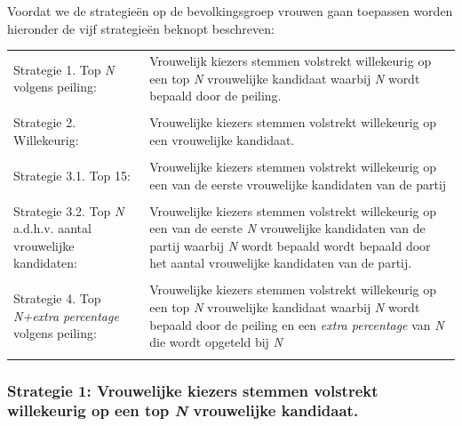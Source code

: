 \noindent Voordat we de strategie\"{e}n op de bevolkingsgroep vrouwen gaan toepassen worden hieronder de vijf strategie\"{e}n beknopt beschreven:\\


\noindent\begin{tabularx}{\textwidth}{LI}
  Strategie 1. Top \textit{N} volgens peiling: & Vrouwelijk kiezers stemmen volstrekt willekeurig op een top \textit{N}  vrouwelijke kandidaat waarbij \textit{N} wordt bepaald door de peiling. \\
  \\
  Strategie 2. Willekeurig: & Vrouwelijke kiezers stemmen volstrekt willekeurig op een vrouwelijke kandidaat.\\
\\
  Strategie 3.1. Top 15: & Vrouwelijke kiezers stemmen volstrekt willekeurig op een van de eerste vrouwelijke kandidaten van de partij \\
\\  
  Strategie 3.2. Top \textit{N} a.d.h.v. aantal vrouwelijke kandidaten: & Vrouwelijke kiezers stemmen volstrekt willekeurig op een van de eerste \textit{N} vrouwelijke kandidaten van de partij waarbij \textit{N} wordt bepaald wordt bepaald door het aantal vrouwelijke kandidaten van de partij.\\
  \\
  Strategie 4. Top \textit{N+extra percentage} volgens peiling: & Vrouwelijke kiezers stemmen volstrekt willekeurig op een top \textit{N} vrouwelijke kandidaat waarbij \textit{N} wordt bepaald door de peiling en een \textit{extra percentage} van \textit{N} die wordt opgeteld bij \textit{N} \\\\
\end{tabularx}




\newpage
\subsubsection{Strategie 1: Vrouwelijke kiezers stemmen volstrekt willekeurig op een top \textit{N} vrouwelijke kandidaat.} \label{S1V}



